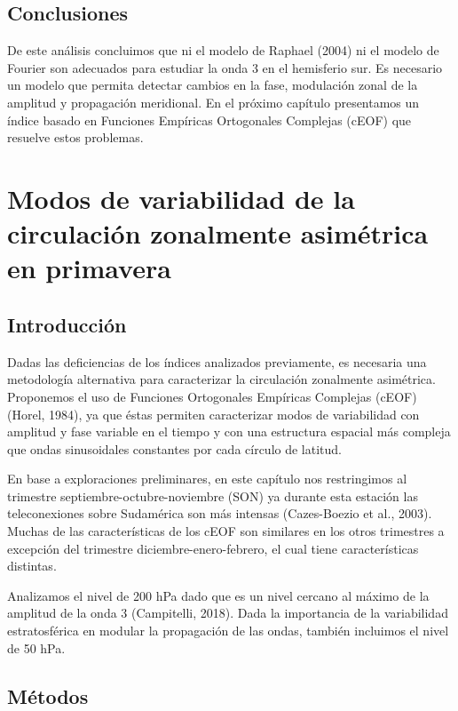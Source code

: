 \documentclass[12pt,oneside]{reedthesis}
\begin{document}
\hypertarget{conclusiones}{%
\section{Conclusiones}\label{conclusiones}}

De este análisis concluimos que ni el modelo de Raphael (2004) ni el modelo de Fourier son adecuados para estudiar la onda 3 en el hemisferio sur.
Es necesario un modelo que permita detectar cambios en la fase, modulación zonal de la amplitud y propagación meridional.
En el próximo capítulo presentamos un índice basado en Funciones Empíricas Ortogonales Complejas (cEOF) que resuelve estos problemas.

\hypertarget{ceofs}{%
\chapter{Modos de variabilidad de la circulación zonalmente asimétrica en primavera}\label{ceofs}}

\hypertarget{introducciuxf3n}{%
\section{Introducción}\label{introducciuxf3n}}

Dadas las deficiencias de los índices analizados previamente, es necesaria una metodología alternativa para caracterizar la circulación zonalmente asimétrica.
Proponemos el uso de Funciones Ortogonales Empíricas Complejas (cEOF) (Horel, 1984), ya que éstas permiten caracterizar modos de variabilidad con amplitud y fase variable en el tiempo y con una estructura espacial más compleja que ondas sinusoidales constantes por cada círculo de latitud.

En base a exploraciones preliminares, en este capítulo nos restringimos al trimestre septiembre-octubre-noviembre (SON) ya durante esta estación las teleconexiones sobre Sudamérica son más intensas (Cazes-Boezio et al., 2003).
Muchas de las características de los cEOF son similares en los otros trimestres a excepción del trimestre diciembre-enero-febrero, el cual tiene características distintas.

Analizamos el nivel de 200 hPa dado que es un nivel cercano al máximo de la amplitud de la onda 3 (Campitelli, 2018).
Dada la importancia de la variabilidad estratosférica en modular la propagación de las ondas, también incluimos el nivel de 50 hPa.

\hypertarget{muxe9todos-2}{%
\section{Métodos}\label{muxe9todos-2}}
\end{document}
